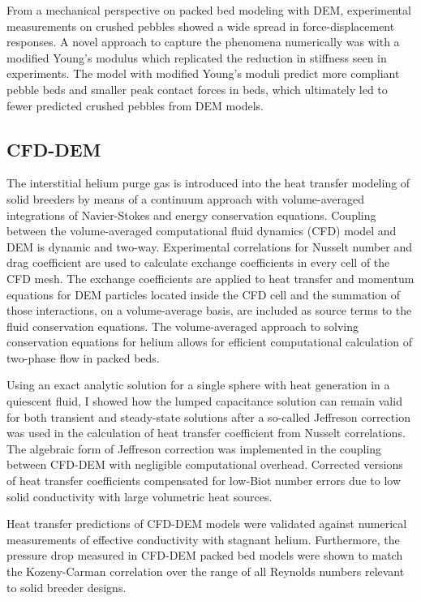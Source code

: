 From a mechanical perspective on packed bed modeling with DEM, experimental measurements on crushed pebbles showed a wide spread in force-displacement responses. A novel approach to capture the phenomena numerically was with a modified Young's modulus which replicated the reduction in stiffness seen in experiments. The model with modified Young's moduli predict more compliant pebble beds and smaller peak contact forces in beds, which ultimately led to fewer predicted crushed pebbles from DEM models.


\subsection{CFD-DEM}
The interstitial helium purge gas is introduced into the heat transfer modeling of solid breeders by means of a continuum approach with volume-averaged integrations of Navier-Stokes and energy conservation equations. Coupling between the volume-averaged computational fluid dynamics (CFD) model and DEM is dynamic and two-way. Experimental correlations for Nusselt number and drag coefficient are used to calculate exchange coefficients in every cell of the CFD mesh. The exchange coefficients are applied to heat transfer and momentum equations for DEM particles located inside the CFD cell and the summation of those interactions, on a volume-average basis, are included as source terms to the fluid conservation equations. The volume-averaged approach to solving conservation equations for helium allows for efficient computational calculation of two-phase flow in packed beds.

Using an exact analytic solution for a single sphere with heat generation in a quiescent fluid, I showed how the lumped capacitance solution can remain valid for both transient and steady-state solutions after a so-called Jeffreson correction was used in the calculation of heat transfer coefficient from Nusselt correlations. The algebraic form of Jeffreson correction was implemented in the coupling between CFD-DEM with negligible computational overhead. Corrected versions of heat transfer coefficients compensated for low-Biot number errors due to low solid conductivity with large volumetric heat sources.

Heat transfer predictions of CFD-DEM models were validated against numerical measurements of effective conductivity with stagnant helium. Furthermore, the pressure drop measured in CFD-DEM packed bed models were shown to match the Kozeny-Carman correlation over the range of all Reynolds numbers relevant to solid breeder designs.


